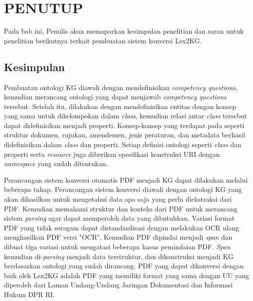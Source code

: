 \chapter{PENUTUP}
\label{chap:6}
Pada bab ini, Penulis akan memaparkan kesimpulan penelitian dan saran untuk penelitian berikutnya
terkait pembuatan sistem konversi Lex2KG.

\section{Kesimpulan}
\label{sec:kesimpulan}

Pembuatan ontologi KG \legal diawali dengan mendefinisikan \textit{competency questions}, kemudian
merancang ontologi yang dapat menjawab \textit{competency questions} tersebut. Setelah itu,
dilakukan dengan mendefinisikan entitas dengan konsep yang sama untuk dikelompokan dalam
\textit{class}, kemudian relasi antar \textit{class} tersebut dapat didefinisikan menjadi properti.
Konsep-konsep yang terdapat pada \legal seperti struktur dokumen, rujukan, amendemen, jenis
peraturan, dan metadata berhasil didefinisikan dalam \textit{class} dan properti. Setiap definisi
ontologi seperti \textit{class} dan properti serta \textit{resource} juga diberikan spesifikasi
konstruksi URI dengan \textit{namespace} yang sudah ditentukan.

Perancangan sistem konversi otomatis PDF \legal menjadi KG dapat dilakukan melalui beberapa tahap.
Perancangan sistem konversi diawali dengan ontologi KG yang akan dihasilkan untuk mengetahui data
apa saja yang perlu diekstraksi dari PDF. Kemudian memahami struktur dan konteks dari PDF untuk
merancang sistem \textit{parsing} agar dapat memperoleh data yang dibutuhkan. Variasi format PDF
yang tidak seragam dapat distandardisasi dengan melakukan OCR ulang menghasilkan PDF versi "OCR".
Kemudian PDF dipindai menjadi \textit{span} dan dibuat tiga variasi untuk mengatasi beberapa kasus
pemindaian PDF. \textit{Span} kemudian di-\textit{parsing} menjadi data terstruktur, dan
dikonstruksi menjadi KG berdasarkan ontologi yang sudah dirancang. PDF yang dapat dikonversi dengan
baik oleh Lex2KG adalah PDF yang memiliki format yang sama dengan UU yang diperoleh dari Laman
Undang-Undang Jaringan Dokumentasi dan Informasi Hukum DPR RI.

